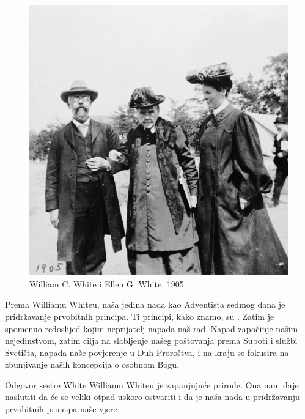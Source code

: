 \begin{figure}
    \centering
    \includegraphics[width=1\linewidth]{images/william-ellen-white-1905.jpg}
    \caption*{William C. White i Ellen G. White, 1905}
    \label{fig:w-e-white}
\end{figure}

Prema Williamu Whiteu, naša jedina nada kao Adventista sedmog dana je pridržavanje prvobitnih principa. Ti principi, kako znamo, su . Zatim je spomenuo redoslijed kojim neprijatelj napada naš rad. Napad započinje našim nejedinstvom, zatim cilja na slabljenje našeg poštovanja prema Suboti i službi Svetišta, napada naše povjerenje u Duh Proroštva, i na kraju se fokusira na zbunjivanje naših koncepcija o osobnom Bogu.

Odgovor sestre White Williamu Whiteu je zapanjujuće prirode. Ona nam daje naslutiti da će se veliki otpad uskoro ostvariti i da je naša nada u pridržavanju prvobitnih principa naše vjere—.

 \\
 \\
 \\

